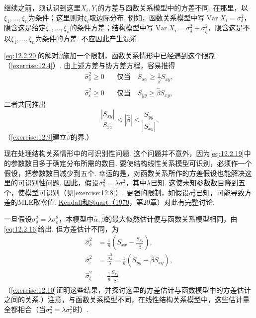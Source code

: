 继续之前，须认识到这里$X_i,Y_i$的方差与函数关系模型中的方差不同. 在那里，以$\xi_1,\ldots,\xi_n$为条件；这里则对$\xi_i$取边际分布. 例如，函数关系模型中写$\operatorname{Var}X_i=\sigma_\delta^2$，隐含这是给定$\xi_1,\ldots,\xi_n$的条件方差；结构模型中写$\operatorname{Var}X_i=\sigma_\delta^2+\sigma_\xi^2$，隐含这是不以$\xi_1,\ldots,\xi_n$为条件的方差. 不应因此产生混淆.

\eqref{eq:12.2.20}的解对$\hat\beta$施加一个限制，函数关系情形中已经遇到这个限制（\autoref{exercise:12.4}）. 由上述方差与协方差方程，容易推得
$$\begin{aligned}
\hat\sigma_\delta^2\ge0&\quad\text{仅当}\quad S_{xx}\ge\frac1{\hat\beta}S_{xy},\\
\hat\sigma_\varepsilon^2\ge0&\quad\text{仅当}\quad S_{yy}\ge\hat\beta S_{xy},
\end{aligned}$$
二者共同推出
$$\frac{|S_{xy}|}{S_{xx}}\le|\hat\beta|\le\frac{S_{yy}}{|S_{xy}|}.$$
（\autoref{exercise:12.9}建立$\hat\beta$的界.）

现在处理结构关系情形中的可识别性问题. 这个问题并不意外，因为\eqref{eq:12.2.19}中的参数数目多于确定分布所需的数目. 要使结构线性关系模型可识别，必须作一个假设，把参数数目减少到五个. 幸运的是，对函数关系所作的方差假设也能解决这里的可识别性问题.
因此，假设$\sigma_\delta^2=\lambda\sigma_\varepsilon^2$，其中$\lambda$已知. 这使未知参数数目降到五个，使模型可识别（见\autoref{exercise:12.8}）. 更强的限制，如假设$\sigma_\delta^2$已知，可能导致方差的MLE取零值. \hyperref[bib:source189]{Kendall和Stuart（1979}，第29章）对此有完整讨论.

一旦假设$\sigma_\delta^2=\lambda\sigma_\varepsilon^2$，本模型中$\hat\alpha,\hat\beta$的最大似然估计便与函数关系模型相同，由\eqref{eq:12.2.16}给出. 但方差估计不同，为
\begin{equation}\label{eq:12.2.21}
\begin{aligned}
\hat\sigma_\delta^2&=\frac1n\left(S_{xx}-\frac{S_{xy}}{\hat\beta}\right),\\
\hat\sigma_\varepsilon^2&=\frac{\hat\sigma_\delta^2}\lambda=\frac1n(S_{yy}-\hat\beta S_{xy}),\\
\hat\sigma_\xi^2&=\frac1n\frac{S_{xy}}{\hat\beta}.
\end{aligned}
\end{equation}
（\autoref{exercise:12.10}证明这些结果，并探讨这里的方差估计与函数模型中的方差估计之间的关系.）注意，与函数关系模型不同，在线性结构关系模型中，这些估计量全都相合（当$\sigma_\delta^2=\lambda\sigma_\varepsilon^2$时）.

